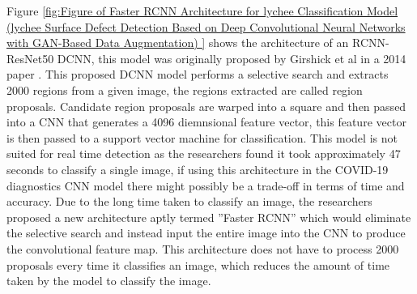 \vspace{0.5mm}
Figure \ref{fig:Figure of Faster RCNN Architecture for lychee Classification Model (lychee Surface Defect Detection Based on Deep Convolutional Neural Networks with GAN-Based Data Augmentation) } shows the architecture of an RCNN-ResNet50 DCNN, this model was originally proposed by Girshick et al in a 2014 paper \cite{litReviewRCNN}.  This proposed DCNN model performs a selective search and extracts 2000 regions from a given image, the regions extracted are called region proposals.  Candidate region proposals are warped into a square and then passed into a CNN that generates a 4096 diemnsional feature vector, this feature vector is then passed to a support vector machine for classification.  This model is not suited for real time detection as the researchers found it took approximately 47 seconds to classify a single image, if using this architecture in the COVID-19 diagnostics CNN model there might possibly be a trade-off in terms of time and accuracy.  Due to the long time taken to classify an image, the researchers proposed a new architecture aptly termed ''Faster RCNN'' which would eliminate the selective search and instead input the entire image into the  CNN to produce the convolutional feature map.  This architecture  does not have to process 2000 proposals every time it classifies an image, which reduces the amount of time taken by the model to classify the image.
